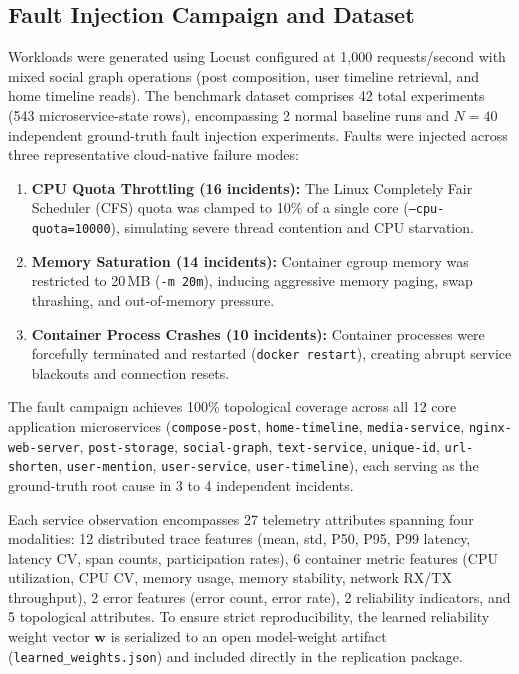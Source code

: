 \documentclass[conference]{IEEEtran}
\begin{document}
\subsection{Fault Injection Campaign and Dataset}
Workloads were generated using Locust configured at 1{,}000 requests/second with mixed social graph operations (post composition, user timeline retrieval, and home timeline reads). The benchmark dataset comprises 42 total experiments (543 microservice-state rows), encompassing 2 normal baseline runs and $N = 40$ independent ground-truth fault injection experiments. Faults were injected across three representative cloud-native failure modes:
\begin{enumerate}
    \item \textbf{CPU Quota Throttling (16 incidents):} The Linux Completely Fair Scheduler (CFS) quota was clamped to 10\% of a single core (\texttt{--cpu-quota=10000}), simulating severe thread contention and CPU starvation.
    \item \textbf{Memory Saturation (14 incidents):} Container cgroup memory was restricted to 20\,MB (\texttt{-m 20m}), inducing aggressive memory paging, swap thrashing, and out-of-memory pressure.
    \item \textbf{Container Process Crashes (10 incidents):} Container processes were forcefully terminated and restarted (\texttt{docker restart}), creating abrupt service blackouts and connection resets.
\end{enumerate}
The fault campaign achieves 100\% topological coverage across all 12 core application microservices (\texttt{compose-post}, \texttt{home-timeline}, \texttt{media-service}, \texttt{nginx-web-server}, \texttt{post-storage}, \texttt{social-graph}, \texttt{text-service}, \texttt{unique-id}, \texttt{url-shorten}, \texttt{user-mention}, \texttt{user-service}, \texttt{user-timeline}), each serving as the ground-truth root cause in 3 to 4 independent incidents.

Each service observation encompasses 27 telemetry attributes spanning four modalities: 12 distributed trace features (mean, std, P50, P95, P99 latency, latency CV, span counts, participation rates), 6 container metric features (CPU utilization, CPU CV, memory usage, memory stability, network RX/TX throughput), 2 error features (error count, error rate), 2 reliability indicators, and 5 topological attributes. To ensure strict reproducibility, the learned reliability weight vector $\mathbf{w}$ is serialized to an open model-weight artifact (\texttt{learned\_weights.json}) and included directly in the replication package.
\end{document}
